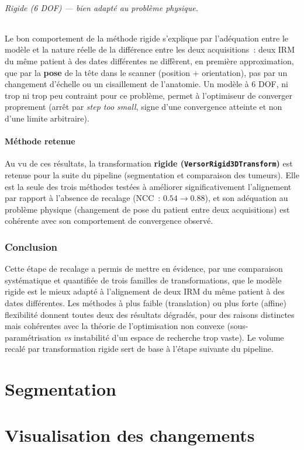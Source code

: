 \documentclass[11pt,a4paper]{article}
\begin{document}
\paragraph{Rigide (6 DOF) — bien adapté au problème physique.}
Le bon comportement de la méthode rigide s'explique par l'adéquation entre le
modèle et la nature réelle de la différence entre les deux acquisitions~: deux
IRM du même patient à des dates différentes ne diffèrent, en première
approximation, que par la \textbf{pose} de la tête dans le scanner (position +
orientation), pas par un changement d'échelle ou un cisaillement de
l'anatomie. Un modèle à 6 DOF, ni trop ni trop peu contraint pour ce problème,
permet à l'optimiseur de converger proprement (arrêt par \emph{step too
small}, signe d'une convergence atteinte et non d'une limite arbitraire).

\subsection{Méthode retenue}

Au vu de ces résultats, la transformation \textbf{rigide
(\texttt{VersorRigid3DTransform})} est retenue pour la suite du pipeline
(segmentation et comparaison des tumeurs). Elle est la seule des trois
méthodes testées à améliorer significativement l'alignement par rapport à
l'absence de recalage (NCC~: $0.54 \rightarrow 0.88$), et son adéquation au
problème physique (changement de pose du patient entre deux acquisitions) est
cohérente avec son comportement de convergence observé.


\section{Conclusion}


Cette étape de recalage a permis de mettre en évidence, par une comparaison
systématique et quantifiée de trois familles de transformations, que le
modèle rigide est le mieux adapté à l'alignement de deux IRM du même patient à
des dates différentes. Les méthodes à plus faible (translation) ou plus forte
(affine) flexibilité donnent toutes deux des résultats dégradés, pour des
raisons distinctes mais cohérentes avec la théorie de l'optimisation
non convexe (sous-paramétrisation \emph{vs} instabilité d'un espace de
recherche trop vaste). Le volume recalé par transformation rigide sert de
base à l'étape suivante du pipeline.


\part{Segmentation}

\part{Visualisation des changements}
\end{document}
